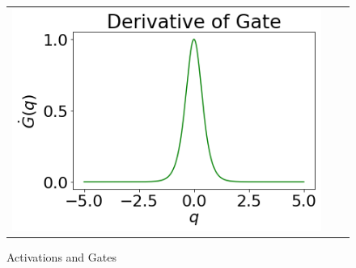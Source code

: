 \begin{figure}[h]
{\begin{tabular}{ccc}
\includegraphics[scale=0.4]{figs/der-gate.png}
\end{tabular}
}
\caption{Activations and Gates}
\label{fig:actgate}
\end{figure}

